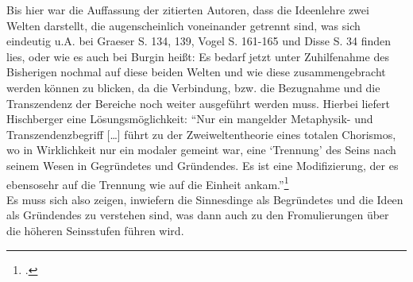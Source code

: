 Bis hier war die Auffassung der zitierten Autoren, dass die Ideenlehre zwei Welten darstellt, die augenscheinlich voneinander getrennt sind, was sich eindeutig u.A. bei Graeser S. 134, 139, Vogel S. 161-165 und Disse S. 34 finden lies, oder wie es auch bei Burgin heißt: 
Es bedarf jetzt unter Zuhilfenahme des Bisherigen nochmal auf diese beiden Welten und wie diese zusammengebracht werden können zu blicken, da die Verbindung, bzw. die Bezugnahme und die Transzendenz der Bereiche noch weiter ausgeführt werden muss.
Hierbei liefert Hischberger eine Lösungsmöglichkeit:
\enquote{Nur ein mangelder Metaphysik- und Transzendenzbegriff [\dots] führt zu der Zweiweltentheorie eines totalen Chorismos, wo in Wirklichkeit nur ein modaler gemeint war, eine \enquote{Trennung} des Seins nach seinem Wesen in Gegründetes und Gründendes. Es ist eine Modifizierung, der es ebensosehr auf die Trennung wie auf die Einheit ankam.}\footcite[][S. 96]{Hirschberger}\\
Es muss sich also zeigen, inwiefern die Sinnesdinge als Begründetes und die Ideen als Gründendes zu verstehen sind, was dann auch zu den Fromulierungen über die höheren Seinsstufen führen wird.
